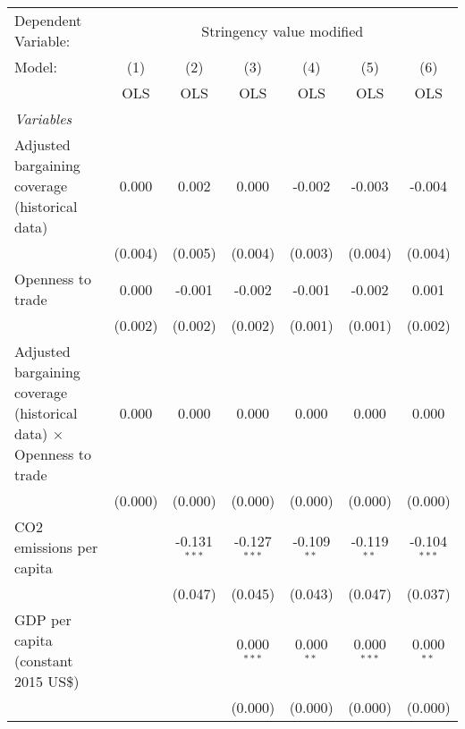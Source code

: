 
\begingroup
\centering
\begin{tabular}{lcccccc}
   \toprule
   Dependent Variable: & \multicolumn{6}{c}{Stringency value modified}\\
   Model:                                                                     & (1)     & (2)            & (3)            & (4)           & (5)           & (6)\\  
                                                                              &  OLS    & OLS            & OLS            & OLS           & OLS           & OLS\\  
   \midrule
   \emph{Variables}\\
   Adjusted bargaining coverage (historical data)                             & 0.000   & 0.002          & 0.000          & -0.002        & -0.003        & -0.004\\   
                                                                              & (0.004) & (0.005)        & (0.004)        & (0.003)       & (0.004)       & (0.004)\\   
   Openness to trade                                                          & 0.000   & -0.001         & -0.002         & -0.001        & -0.002        & 0.001\\   
                                                                              & (0.002) & (0.002)        & (0.002)        & (0.001)       & (0.001)       & (0.002)\\   
   Adjusted bargaining coverage (historical data) $\times$ Openness to trade  & 0.000   & 0.000          & 0.000          & 0.000         & 0.000         & 0.000\\   
                                                                              & (0.000) & (0.000)        & (0.000)        & (0.000)       & (0.000)       & (0.000)\\   
   CO2 emissions per capita                                                   &         & -0.131$^{***}$ & -0.127$^{***}$ & -0.109$^{**}$ & -0.119$^{**}$ & -0.104$^{***}$\\   
                                                                              &         & (0.047)        & (0.045)        & (0.043)       & (0.047)       & (0.037)\\   
   GDP per capita (constant 2015 US\$)                                        &         &                & 0.000$^{***}$  & 0.000$^{**}$  & 0.000$^{***}$ & 0.000$^{**}$\\   
                                                                              &         &                & (0.000)        & (0.000)       & (0.000)       & (0.000)\\   

\end{tabular}
